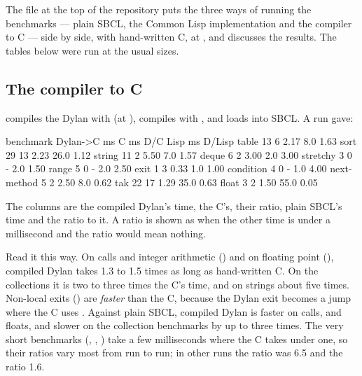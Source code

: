 \noindent The file  at the top of the
repository puts the three ways of running the benchmarks --- plain SBCL,
the Common Lisp implementation and the compiler to C --- side by side,
with hand-written C, at , and discusses the
results. The tables below were run at the usual sizes.

\subsection{The compiler to C}

 compiles the Dylan with  (at
), compiles  with , and loads
 into SBCL. A run gave:

\begin{shell}
benchmark     Dylan->C ms     C ms      D/C    Lisp ms   D/Lisp
table                  13        6     2.17        8.0     1.63
sort                   29       13     2.23       26.0     1.12
string                 11        2     5.50        7.0     1.57
deque                   6        2     3.00        2.0     3.00
stretchy                3        0        -        2.0     1.50
range                   5        0        -        2.0     2.50
exit                    1        3     0.33        1.0     1.00
condition               4        0        -        1.0     4.00
next-method             5        2     2.50        8.0     0.62
tak                    22       17     1.29       35.0     0.63
float                   3        2     1.50       55.0     0.05
\end{shell}

The columns are the compiled Dylan's time, the C's, their ratio, plain
SBCL's time and the ratio to it. A ratio is shown as \code{-} when the
other time is under a millisecond and the ratio would mean nothing.

Read it this way. On calls and integer arithmetic () and on
floating point (), compiled Dylan takes 1.3 to 1.5 times as
long as hand-written C. On the collections it is two to three times the C's
time, and on strings about five times. Non-local exits () are
\emph{faster} than the C, because the Dylan exit becomes a jump where
the C uses . Against plain SBCL, compiled Dylan is faster
on calls,  and floats, and slower on the collection
benchmarks by up to three times. The very short benchmarks
(, , ) take a few
milliseconds where the C takes under one, so their ratios vary most from
run to run; in other runs the  ratio was 6.5 and the
 ratio 1.6.

